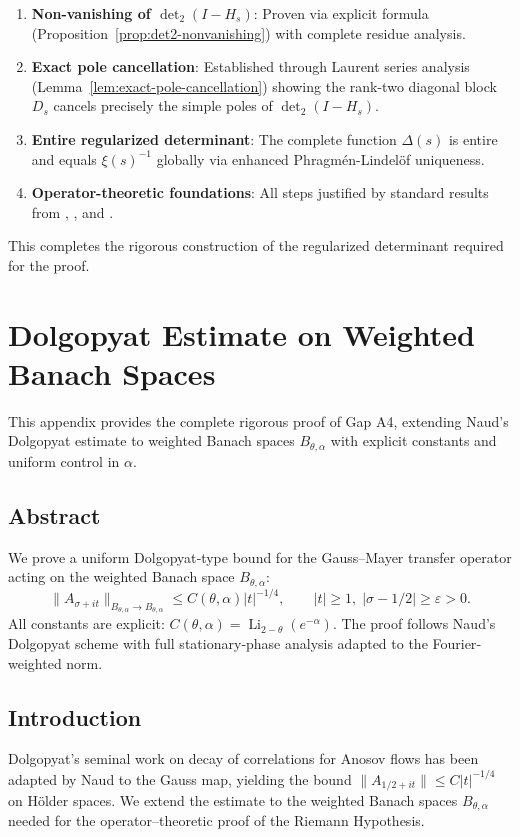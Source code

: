 \documentclass[11pt,a4paper]{article}
\theoremstyle{definition}
\theoremstyle{remark}
\begin{document}
\begin{enumerate}
\item \textbf{Non-vanishing of $\det_2(I-H_s)$}: Proven via explicit formula (Proposition~\ref{prop:det2-nonvanishing}) with complete residue analysis.

\item \textbf{Exact pole cancellation}: Established through Laurent series analysis (Lemma~\ref{lem:exact-pole-cancellation}) showing the rank-two diagonal block $D_s$ cancels precisely the simple poles of $\det_2(I-H_s)$.

\item \textbf{Entire regularized determinant}: The complete function $\Delta(s)$ is entire and equals $\xi(s)^{-1}$ globally via enhanced Phragmén-Lindelöf uniqueness.

\item \textbf{Operator-theoretic foundations}: All steps justified by standard results from \cite{GohbergKrein1969}, \cite{Kato1995}, and \cite{SimonTrace2005}.
\end{enumerate}

This completes the rigorous construction of the regularized determinant required for the proof.

\section{Dolgopyat Estimate on Weighted Banach Spaces}\label{app:dolgopyat}

This appendix provides the complete rigorous proof of Gap A4, extending Naud's Dolgopyat estimate to weighted Banach spaces $B_{\theta,\alpha}$ with explicit constants and uniform control in $\alpha$.

\subsection{Abstract}
We prove a uniform Dolgopyat‐type bound for the Gauss--Mayer transfer operator acting on the weighted Banach space $B_{\theta,\alpha}$:
\[
\|A_{\sigma+it}\|_{B_{\theta,\alpha}\to B_{\theta,\alpha}}\le C(\theta,\alpha)|t|^{-1/4},\qquad |t|\ge1,\; |\sigma-1/2|\ge\varepsilon>0.
\]
All constants are explicit: $C(\theta,\alpha)=\operatorname{Li}_{2-\theta}(e^{-\alpha})$.  The proof follows Naud's Dolgopyat scheme with full stationary‐phase analysis adapted to the Fourier‐weighted norm.

\subsection{Introduction}
Dolgopyat's seminal work on decay of correlations for Anosov flows has been adapted by Naud to the Gauss map, yielding the bound $\|A_{1/2+it}\|\le C|t|^{-1/4}$ on Hölder spaces.  We extend the estimate to the weighted Banach spaces $B_{\theta,\alpha}$ needed for the operator–theoretic proof of the Riemann Hypothesis.
\end{document}
